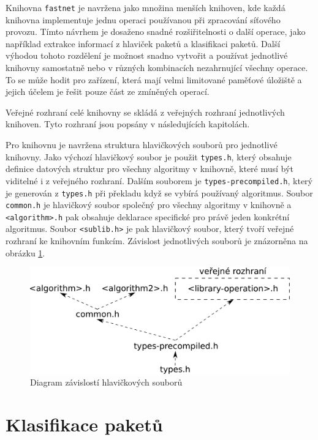 Knihovna \texttt{fastnet} je navržena jako množina menších knihoven, kde každá knihovna implementuje
jednu operaci používanou při zpracování síťového provozu.
Tímto návrhem je dosaženo snadné rozšiřitelnosti o další operace,
jako například extrakce informací z hlaviček paketů a klasifikaci paketů.
Další výhodou tohoto rozdělení je možnost snadno vytvořit a používat jednotlivé knihovny samostatně nebo v různých kombinacích nezahrnující všechny operace.
To se může hodit pro zařízení, která mají velmi limitované paměťové úložiště a jejich účelem
je řešit pouze část ze zmíněných operací.

Veřejné rozhraní celé knihovny se skládá z veřejných rozhraní jednotlivých knihoven.
Tyto rozhraní jsou popsány v následujících kapitolách.

Pro knihovnu je navržena struktura hlavičkových souborů pro jednotlivé knihovny.
Jako výchozí hlavičkový soubor je použit \texttt{types.h},
který obsahuje definice datových struktur pro všechny algoritmy v knihovně, které musí být
viditelné i z veřejného rozhraní. Dalším souborem je \texttt{types-precompiled.h},
který je generován z \texttt{types.h} při překladu když se vybírá používaný algoritmus.
Soubor \texttt{common.h} je hlavičkový soubor společný pro všechny algoritmy v knihovně a \texttt{<algorithm>.h}
pak obsahuje deklarace specifické pro právě jeden konkrétní algoritmus.
Soubor \texttt{<sublib.h>} je pak hlavičkový soubor, který tvoří veřejné rozhraní ke knihovním funkcím.
Závislost jednotlivých souborů je znázorněna na obrázku \ref{fig:header-dependecies}.

\begin{figure}[!htbp]
    \centering
    \includegraphics[scale=.25]{fig/header-dependencies.pdf}
    \caption{Diagram závislostí hlavičkových souborů}
    \label{fig:header-dependecies}
\end{figure}


\section{Klasifikace paketů}\label{api:pc} %

